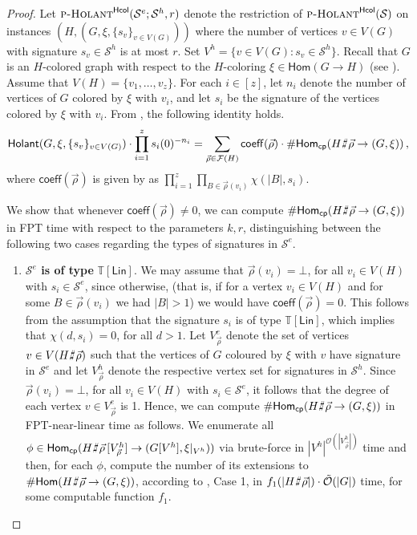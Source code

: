 \documentclass[authorcolumns,numberwithinsect]{no-lipics-v2022}
\newcommand{\homs}[2]{\mathsf{Hom}(#1 \to #2)}
\def\fracture#1#2{\ensuremath{#1\raisebox{.2ex}{\rotatebox[origin=c]{-15}{$\sharp$}}#2}}
\newcommand{\holantprobstar}{\text{\sc{p-Holant}}^{\mathsf{Hcol}}}
\newcommand{\homscp}{\mathsf{Hom}_{\mathsf{cp}}}
\newcommand{\holant}{\mathsf{Holant}}
\def\fracture#1#2{\ensuremath{#1\raisebox{.2ex}{\rotatebox[origin=c]{-15}{$\sharp$}}#2}}
\begin{document}
\begin{proof} 
Let $\holantprobstar(\mathcal{S}^e;\mathcal{S}^h, r)$ denote the restriction of $\holantprobstar(\mathcal{S})$ on instances $(H, (G,\xi,\{s_v\}_{v\in V(G)}))$ where the number of vertices $v \in V(G)$ with signature $s_v \in \mathcal{S}^h$ is at most $r$. Set $V^h = \{v \in V(G) : s_v \in \mathcal{S}^h\}$. Recall that $G$ is an $H$-colored graph with respect to the $H$-coloring $\xi \in \homs{G}{H}$ (see ). Assume that $V(H)=\{v_1,\dots,v_z\}$. For each $i\in [z]$, let $n_i$ denote the number of vertices of $G$ colored by $\xi$ with $v_i$, and let $s_i$ be the signature of the vertices colored by $\xi$ with $v_i$. From , the following identity holds.
\begin{equation}
\holant(G,\xi,\{s_v\}_{v\in V(G)}) \cdot \prod_{i=1}^z s_i(0)^{-n_i} = \sum_{\vec{\rho}\in \mathcal{F}(H)} \mathsf{coeff}(\vec{\rho})  \cdot \#\homscp(\fracture{H}{\vec{\rho}} \to (G,\xi))\,,   
\end{equation}
where $\mathsf{coeff}(\vec{\rho})$ is given by  as $\prod_{i = 1}^{z}\prod_{B \in \vec{\rho}(v_i)}\chi(|B|, s_i)$.

We show that whenever $\mathsf{coeff}(\vec{\rho}) \neq 0$, we can compute $\#\homscp(\fracture{H}{\vec{\rho}} \to (G, \xi))$  in FPT time with respect to the parameters $k, r$,  distinguishing between the following two cases regarding the types of signatures in $\mathcal{S}^e$.
\begin{enumerate}
    \item \textbf{$\mathcal{S}^e$ is of type} $\mathbb{T}[\mathsf{Lin}]$. We may assume that $\vec{\rho}(v_i) = \bot$, for all $v_i \in V(H)$ with $s_i \in \mathcal{S}^e$, since otherwise, (that is, if for a vertex $v_i \in V(H)$ and for some $B \in \vec{\rho}(v_i)$ we had $|B| > 1$) we would have $\mathsf{coeff}(\vec{\rho}) = 0$. This follows from the assumption that the signature $s_i$ is of type $\mathbb{T}[\mathsf{Lin}]$, which implies that $\chi(d, s_i) = 0$, for all $d > 1$. Let $V^e_{\vec{\rho}}$ denote the set of vertices $v \in V(\fracture{H}{\vec{\rho}})$ such that the vertices of $G$ coloured by $\xi$ with $v$ have signature in $\mathcal{S}^e$ and let $V^h_{\vec{\rho}}$ denote the respective vertex set for signatures in $\mathcal{S}^h$. Since $\vec{\rho}(v_i) = \bot$, for all $v_i \in V(H)$ with $s_i \in \mathcal{S}^e$, it follows that the degree of each vertex $v\in V^e_{\vec{\rho}}$ is 1. Hence, we can compute $\#\homscp(\fracture{H}{\vec{\rho}} \to (G,\xi))$ in FPT-near-linear time as follows. We enumerate all $\phi \in \homscp(\fracture{H}{\vec{\rho}}\,[V^h_{\vec{\rho}}] \to (G[V^h],\xi|_{V^h}))$ via brute-force in $|V^h|^{\mathcal{O}(|V_{\vec{\rho}}^h|)}$ time and then, for each $\phi$, compute the number of its extensions to $\#\homs{\fracture{H}{\vec{\rho}}}{(G,\xi)}$, according to , Case 1, in $f_1(|\fracture{H}{\vec{\rho}}|)\cdot\tilde{\mathcal{O}}(|G|)$ time, for some computable function $f_1$.


\end{enumerate}
\end{proof}
\end{document}
